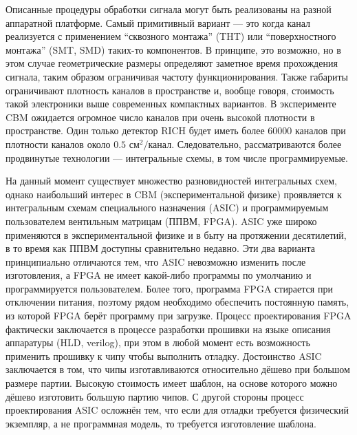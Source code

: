 Описанные процедуры обработки сигнала могут быть реализованы на разной аппаратной платформе. Самый примитивный вариант --- это когда канал реализуется с применением ``сквозного монтажа'' (THT) или ``поверхностного монтажа'' (SMT, SMD) \todo таких-то компонентов. В принципе, это возможно, но в этом случае геометрические размеры определяют заметное время прохождения сигнала, таким образом ограничивая частоту функционирования. Также габариты ограничивают плотность каналов в пространстве и, вообще говоря, стоимость такой электроники выше современных компактных вариантов. В эксперименте CBM ожидается огромное число каналов при очень высокой плотности в пространстве. Один только детектор RICH будет иметь более 60000 каналов при плотности каналов около $0.5$ см$^{2}/$канал. Следовательно, рассматриваются более продвинутые технологии --- интегральные схемы, в том числе программируемые.

На данный момент существует множество разновидностей интегральных схем, однако наибольший интерес в CBM (экспериментальной физике\todo) проявляется к интегральным схемам специального назначения (ASIC) и программируемым пользователем вентильным матрицам (ППВМ, FPGA). ASIC уже широко применяются в экспериментальной физике и в быту на протяжении десятилетий, в то время как ППВМ доступны сравнительно недавно. Эти два варианта принципиально отличаются тем, что ASIC невозможно изменить после изготовления, а FPGA не имеет какой-либо программы по умолчанию и программируется пользователем. Более того, программа FPGA стирается при отключении питания, поэтому рядом необходимо обеспечить постоянную память, из которой FPGA берёт программу при загрузке. Процесс проектирования FPGA фактически заключается в процессе разработки прошивки на языке описания аппаратуры (HLD, verilog), при этом в любой момент есть возможность применить прошивку к чипу чтобы выполнить отладку. Достоинство ASIC заключается в том, что чипы изготавливаются относительно дёшево при большом размере партии. Высокую стоимость имеет шаблон, на основе которого можно дёшево изготовить большую партию чипов. С другой стороны процесс проектирования ASIC осложнён тем, что если для отладки требуется физический экземпляр, а не программная модель, то требуется изготовление шаблона.

